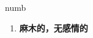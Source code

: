
\begin{frame}
{\huge numb}
\begin{center}
\begin{enumerate}\Large
  \item \textbf{麻木的，无感情的}
\end{enumerate}
\end{center}
\end{frame}
